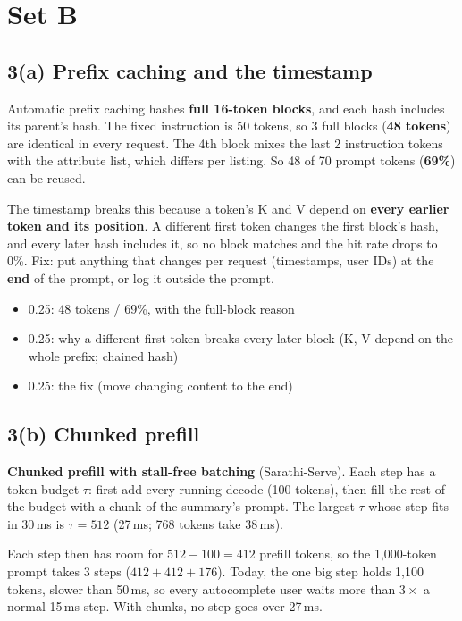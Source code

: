 \documentclass[10pt]{article}
\newenvironment{rubric}{%
  \begin{tcolorbox}[colback=black!4, colframe=black!40, boxrule=0.4pt,
                    arc=0pt, title={Rubric}, fonttitle=\bfseries\small,
                    coltitle=black, colbacktitle=black!12]
  \small\begin{itemize}[leftmargin=*, nosep]}{%
  \end{itemize}\end{tcolorbox}}
\begin{document}
\newpage
\section*{Set B}

\subsection*{3(a) Prefix caching and the timestamp}

Automatic prefix caching hashes \textbf{full 16-token blocks}, and each
hash includes its parent's hash. The fixed instruction is 50 tokens, so 3
full blocks (\textbf{48 tokens}) are identical in every request. The 4th
block mixes the last 2 instruction tokens with the attribute list, which
differs per listing. So 48 of 70 prompt tokens (\textbf{69\%}) can be
reused.

The timestamp breaks this because a token's K and V depend on
\textbf{every earlier token and its position}. A different first token
changes the first block's hash, and every later hash includes it, so no
block matches and the hit rate drops to 0\%. Fix: put anything that
changes per request (timestamps, user IDs) at the \textbf{end} of the
prompt, or log it outside the prompt.

\begin{rubric}
\item 0.25: 48 tokens / 69\%, with the full-block reason
\item 0.25: why a different first token breaks every later block (K, V
  depend on the whole prefix; chained hash)
\item 0.25: the fix (move changing content to the end)
\end{rubric}

\subsection*{3(b) Chunked prefill}

\textbf{Chunked prefill with stall-free batching} (Sarathi-Serve). Each
step has a token budget $\tau$: first add every running decode (100
tokens), then fill the rest of the budget with a chunk of the summary's
prompt. The largest $\tau$ whose step fits in 30\,ms is \textbf{$\tau =
512$} (27\,ms; 768 tokens take 38\,ms).

Each step then has room for $512 - 100 = 412$ prefill tokens, so the
1{,}000-token prompt takes 3 steps ($412 + 412 + 176$). Today, the one big
step holds 1{,}100 tokens, slower than 50\,ms, so every autocomplete user
waits more than $3\times$ a normal 15\,ms step. With chunks, no step goes
over 27\,ms.
\end{document}
